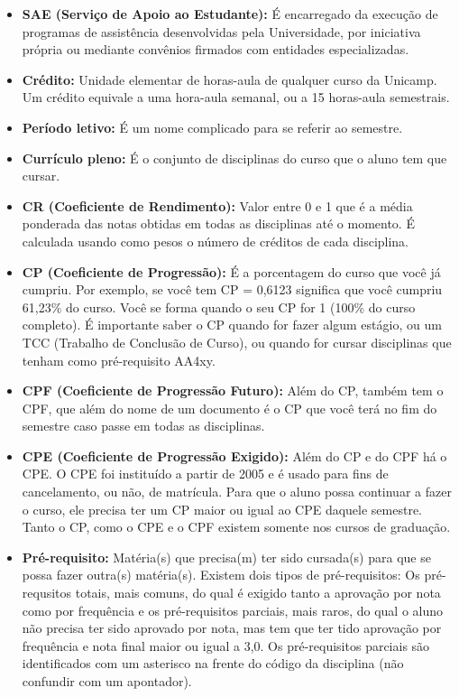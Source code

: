 \begin{itemize}
    \item  \textbf{SAE (Serviço de Apoio ao Estudante):} É encarregado da
    execução de programas de assistência desenvolvidas pela Universidade, por
    iniciativa própria ou mediante convênios firmados com entidades
    especializadas.

    \item  \textbf{Crédito:} Unidade elementar de horas-aula de qualquer curso
    da Unicamp. Um crédito equivale a uma hora-aula semanal, ou a 15 horas-aula
    semestrais.

    \item  \textbf{Período letivo:} É um nome complicado para se referir ao
    semestre.

    \item  \textbf{Currículo pleno:} É o conjunto de disciplinas do curso que
    o aluno tem que cursar.

    \item  \textbf{CR (Coeficiente de Rendimento):} Valor entre 0 e 1 que
    é a média ponderada das notas obtidas em todas as disciplinas até o momento.
    É calculada usando como pesos o número de créditos de cada disciplina.

    \item  \textbf{CP (Coeficiente de Progressão):} É a porcentagem do curso que
    você já cumpriu. Por exemplo, se você tem CP = 0,6123 significa que você
    cumpriu 61,23\% do curso. Você se forma quando o seu CP for 1 (100\% do
    curso completo). É importante saber o CP quando for fazer algum estágio, ou
    um TCC (Trabalho de Conclusão de Curso), ou quando for cursar disciplinas
    que tenham como pré-requisito AA4xy.

    \item  \textbf{CPF (Coeficiente de Progressão Futuro):} Além do CP,
    também tem o CPF, que além do nome de um documento é o CP que você
    terá no fim do semestre caso passe em todas as disciplinas.

    \item  \textbf{CPE (Coeficiente de Progressão Exigido):} Além do CP
    e do CPF há o CPE. O CPE foi instituído a partir de 2005 e é usado
    para fins de cancelamento, ou não, de matrícula. Para que o aluno
    possa continuar a fazer o curso, ele precisa ter um CP maior ou
    igual ao CPE daquele semestre. Tanto o CP, como o CPE e o CPF
    existem somente nos cursos de graduação.

    \item  \textbf{Pré-requisito:} Matéria(s) que precisa(m) ter sido cursada(s)
    para que se possa fazer outra(s) matéria(s). Existem dois tipos de
    pré-requisitos: Os pré-requsitos totais, mais comuns, do qual é exigido
    tanto a aprovação por nota como por frequência e os pré-requisitos parciais,
    mais raros, do qual o aluno não precisa ter sido aprovado por nota, mas tem
    que ter tido aprovação por frequência e nota final maior ou igual a 3,0. Os
    pré-requisitos parciais são identificados com um asterisco na frente do
    código da disciplina (não confundir com um apontador).


\end{itemize}
